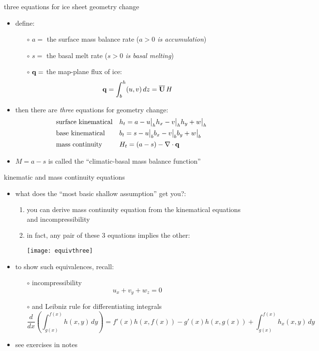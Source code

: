 \begin{frame}{three equations for ice sheet geometry change}

\begin{itemize}
\item define:
  \begin{itemize}
  \item[$\circ$] $a=$ the surface mass balance rate (\emph{$a>0$ is accumulation})
  \item[$\circ$] $s=$ the basal melt rate (\emph{$s>0$ is basal melting})
  \item[$\circ$] $\mathbf{q}=$ the map-plane flux of ice:
	$$\mathbf{q} = \int_{b}^{h} (u,v)\,dz = \overline{\mathbf{U}}\,H$$
  \end{itemize}
\item then there are \emph{three} equations for geometry change:
\begin{align*}
&\text{surface kinematical} && h_t = a - u\big|_h h_x - v\big|_h h_y + w\big|_h  \\
&\text{base kinematical} && b_t = s - u\big|_b b_x - v\big|_b b_y + w\big|_b  \\
&\text{mass continuity} && H_t = (a-s) - \nabla\cdot \mathbf{q} \\
\end{align*}
\item $M=a-s$ is called the ``climatic-basal mass balance function''
\end{itemize}
\end{frame}


\begin{frame}{kinematic and mass continuity equations}

\begin{itemize}
\item what does the ``most basic shallow assumption'' get you?:
  \begin{enumerate}
  \item you can derive mass continuity equation from the kinematical equations and incompressibility
  \item in fact, \alert{any pair of these 3 equations implies the other:}
  
  \bigskip
    \hfill\texttt{[image: equivthree]}
  \end{enumerate}

\vspace{-14mm}
\item to show such equivalences, recall:
  \begin{itemize}
  \item[$\circ$]  incompressibility
    $$u_x + v_y + w_z = 0$$
  \item[$\circ$]  and Leibniz rule for differentiating integrals
  \scriptsize
    $$\frac{d}{dx}\left(\int_{g(x)}^{f(x)} h(x,y)\,dy\right) = f'(x) h(x,f(x)) - g'(x) h(x,g(x)) + \int_{g(x)}^{f(x)} h_x(x,y)\,dy$$
  \end{itemize}
\item see exercises in notes
\end{itemize}
\end{frame}


